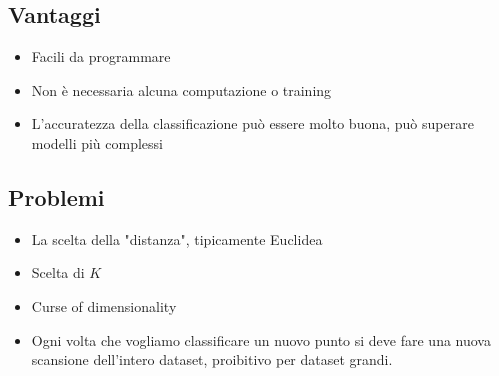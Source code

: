 	\subsection{Vantaggi}
	\begin{multicols}{2}
		\begin{itemize}
			\item Facili da programmare
			\item Non \`e necessaria alcuna computazione o training
			\item L'accuratezza della classificazione può essere molto buona, può superare modelli più complessi
		\end{itemize}
	\end{multicols}

	\subsection{Problemi}
	\begin{multicols}{2}
		\begin{itemize}
			\item La scelta della "distanza", tipicamente Euclidea
			\item Scelta di $K$
			\item Curse of dimensionality
			\item Ogni volta che vogliamo classificare un nuovo punto si deve fare una nuova scansione dell'intero dataset, proibitivo per dataset grandi.
		\end{itemize}
	\end{multicols}